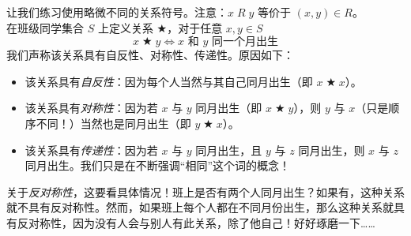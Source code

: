 \begin{example}
    让我们练习使用略微不同的关系符号。注意：$x \;R\; y$ 等价于 $(x, y) \in R$。\\
    在班级同学集合 $S$ 上定义关系 $\bigstar$，对于任意 $x,y \in S$
    \[x \;\bigstar\; y \iff x \text{\ 和\ } y \text{\ 同一个月出生}\]
    我们声称该关系具有自反性、对称性、传递性。原因如下：
    \begin{itemize}
        \item 该关系具有\emph{自反性}：因为每个人当然与其自己同月出生（即 $x \;\bigstar\; x$）。
        \item 该关系具有\emph{对称性}：因为若 $x$ 与 $y$ 同月出生（即 $x \;\bigstar\; y$），则 $y$ 与 $x$（只是顺序不同！）当然也是同月出生（即 $y \;\bigstar\; x$）。
        \item 该关系具有\emph{传递性}：因为若 $x$ 与 $y$ 同月出生，且 $y$ 与 $z$ 同月出生，则 $x$ 与 $z$ 同月出生。我们只是在不断强调``相同''这个词的概念！
    \end{itemize}
    关于\emph{反对称性}，这要看具体情况！班上是否有两个人同月出生？如果有，这种关系就不具有反对称性。然而，如果班上每个人都在不同月份出生，那么这种关系就具有反对称性，因为没有人会与别人有此关系，除了他自己！好好琢磨一下……
\end{example}

